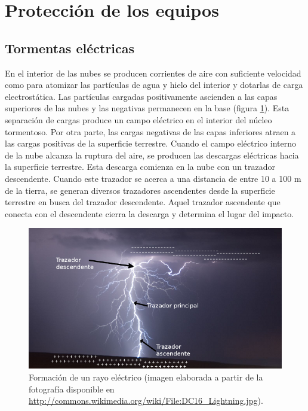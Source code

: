 \section{Protección de los equipos}


\subsection{Tormentas eléctricas}

En el interior de las nubes se producen corrientes de aire con suficiente
velocidad como para atomizar las partículas de agua y hielo del interior
y dotarlas de carga electrostática. Las partículas cargadas positivamente
ascienden a las capas superiores de las nubes y las negativas permanecen
en la base (figura \ref{fig:Formaci=0000F3nRayo}). Esta separación
de cargas produce un campo eléctrico en el interior del núcleo tormentoso.
Por otra parte, las cargas negativas de las capas inferiores atraen
a las cargas positivas de la superficie terrestre. Cuando el campo
eléctrico interno de la nube alcanza la ruptura del aire, se producen
las descargas eléctricas hacia la superficie terrestre. Esta descarga
comienza en la nube con un trazador descendente. Cuando este trazador
se acerca a una distancia de entre 10 a 100 m de la tierra, se generan
diversos trazadores ascendentes desde la superficie terrestre en busca
del trazador descendente. Aquel trazador ascendente que conecta con
el descendente cierra la descarga y determina el lugar del impacto.

%
\begin{figure}
\begin{centering}
\includegraphics[scale=0.65]{../figs/Tormenta}
\end{centering}

\caption[Formación de un rayo eléctrico.]{\label{fig:Formaci=0000F3nRayo}Formación de un rayo eléctrico {\footnotesize (imagen
elaborada a partir de la fotografía disponible en }\protect \\
{\footnotesize \protect\url{http://commons.wikimedia.org/wiki/File:DC16_Lightning.jpg})}. }

\end{figure}


